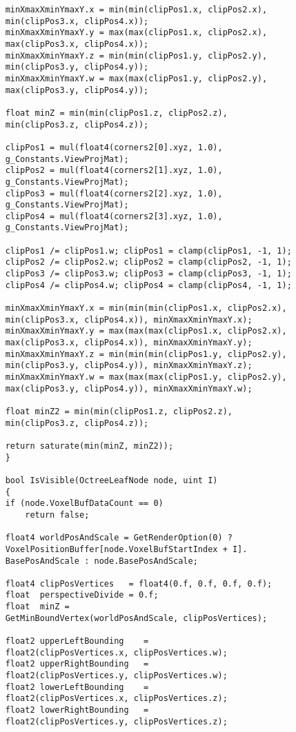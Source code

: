 \begin{lstlisting}
    minXmaxXminYmaxY.x = min(min(clipPos1.x, clipPos2.x), 
    min(clipPos3.x, clipPos4.x));
    minXmaxXminYmaxY.y = max(max(clipPos1.x, clipPos2.x), 
    max(clipPos3.x, clipPos4.x));
    minXmaxXminYmaxY.z = min(min(clipPos1.y, clipPos2.y), 
    min(clipPos3.y, clipPos4.y));
    minXmaxXminYmaxY.w = max(max(clipPos1.y, clipPos2.y), 
    max(clipPos3.y, clipPos4.y));
    
    float minZ = min(min(clipPos1.z, clipPos2.z), 
    min(clipPos3.z, clipPos4.z));
    
    clipPos1 = mul(float4(corners2[0].xyz, 1.0), 
    g_Constants.ViewProjMat);
    clipPos2 = mul(float4(corners2[1].xyz, 1.0), 
    g_Constants.ViewProjMat);
    clipPos3 = mul(float4(corners2[2].xyz, 1.0), 
    g_Constants.ViewProjMat);
    clipPos4 = mul(float4(corners2[3].xyz, 1.0), 
    g_Constants.ViewProjMat);
    
    clipPos1 /= clipPos1.w; clipPos1 = clamp(clipPos1, -1, 1);
    clipPos2 /= clipPos2.w; clipPos2 = clamp(clipPos2, -1, 1);
    clipPos3 /= clipPos3.w; clipPos3 = clamp(clipPos3, -1, 1);
    clipPos4 /= clipPos4.w; clipPos4 = clamp(clipPos4, -1, 1);
    
    minXmaxXminYmaxY.x = min(min(min(clipPos1.x, clipPos2.x), 
    min(clipPos3.x, clipPos4.x)), minXmaxXminYmaxY.x);
    minXmaxXminYmaxY.y = max(max(max(clipPos1.x, clipPos2.x), 
    max(clipPos3.x, clipPos4.x)), minXmaxXminYmaxY.y);
    minXmaxXminYmaxY.z = min(min(min(clipPos1.y, clipPos2.y), 
    min(clipPos3.y, clipPos4.y)), minXmaxXminYmaxY.z);
    minXmaxXminYmaxY.w = max(max(max(clipPos1.y, clipPos2.y), 
    max(clipPos3.y, clipPos4.y)), minXmaxXminYmaxY.w);
    
    float minZ2 = min(min(clipPos1.z, clipPos2.z), 
    min(clipPos3.z, clipPos4.z));
    
    return saturate(min(minZ, minZ2));
    }

    bool IsVisible(OctreeLeafNode node, uint I)
    {    
    if (node.VoxelBufDataCount == 0)
        return false;
    
    float4 worldPosAndScale = GetRenderOption(0) ? 
    VoxelPositionBuffer[node.VoxelBufStartIndex + I].
    BasePosAndScale : node.BasePosAndScale;
    
    float4 clipPosVertices   = float4(0.f, 0.f, 0.f, 0.f); 
    float  perspectiveDivide = 0.f;
    float  minZ = 
    GetMinBoundVertex(worldPosAndScale, clipPosVertices);
    
    float2 upperLeftBounding    = 
    float2(clipPosVertices.x, clipPosVertices.w);
    float2 upperRightBounding   = 
    float2(clipPosVertices.y, clipPosVertices.w);
    float2 lowerLeftBounding    = 
    float2(clipPosVertices.x, clipPosVertices.z);
    float2 lowerRightBounding   = 
    float2(clipPosVertices.y, clipPosVertices.z);
    

\end{lstlisting}
